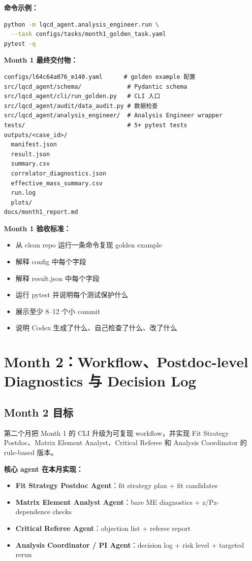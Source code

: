 \documentclass[11pt,a4paper,fontset=fandol]{ctexart}
\begin{document}
\textbf{命令示例：}
\begin{lstlisting}[language=bash]
python -m lqcd_agent.analysis_engineer.run \
  --task configs/tasks/month1_golden_task.yaml
pytest -q
\end{lstlisting}

\textbf{Month 1 最终交付物：}
\begin{lstlisting}
configs/l64c64a076_m140.yaml      # golden example 配置
src/lqcd_agent/schema/             # Pydantic schema
src/lqcd_agent/cli/run_golden.py   # CLI 入口
src/lqcd_agent/audit/data_audit.py # 数据检查
src/lqcd_agent/analysis_engineer/  # Analysis Engineer wrapper
tests/                             # 5+ pytest tests
outputs/<case_id>/
  manifest.json
  result.json
  summary.csv
  correlator_diagnostics.json
  effective_mass_summary.csv
  run.log
  plots/
docs/month1_report.md
\end{lstlisting}

\textbf{Month 1 验收标准：}
\begin{itemize}
  \item 从 clean repo 运行一条命令复现 golden example
  \item 解释 config 中每个字段
  \item 解释 result.json 中每个字段
  \item 运行 pytest 并说明每个测试保护什么
  \item 展示至少 8--12 个小 commit
  \item 说明 Codex 生成了什么、自己检查了什么、改了什么
\end{itemize}

\newpage

\section{Month 2：Workflow、Postdoc-level Diagnostics 与 Decision Log}

\subsection{Month 2 目标}

第二个月把 Month 1 的 CLI 升级为可复现 workflow，并实现 Fit Strategy Postdoc、Matrix Element Analyst、Critical Referee 和 Analysis Coordinator 的 rule-based 版本。

\textbf{核心 agent 在本月实现：}
\begin{itemize}
  \item \textbf{Fit Strategy Postdoc Agent}：fit strategy plan + fit candidates
  \item \textbf{Matrix Element Analyst Agent}：bare ME diagnostics + z/Pz-dependence checks
  \item \textbf{Critical Referee Agent}：objection list + referee report
  \item \textbf{Analysis Coordinator / PI Agent}：decision log + risk level + targeted rerun
\end{itemize}
\end{document}
